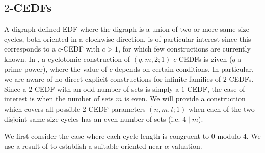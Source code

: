 \documentclass[12pt, a4paper]{article}
\theoremstyle{definition}
\begin{document}
\subsection{$2$-CEDFs}
A digraph-defined EDF where the digraph is a union of two or more same-size cycles, both oriented in a clockwise direction, is of particular interest since this corresponds to a $c$-CEDF with $c>1$, for which few constructions are currently known. In \cite{Wuetal}, a cyclotomic construction of $(q,m,2;1)$-$c$-CEDFs is given ($q$ a prime power), where the value of $c$ depends on certain conditions. In particular, we are aware of no direct explicit constructions for infinite families of $2$-CEDFs.  Since a $2$-CEDF with an odd number of sets is simply a $1$-CEDF, the case of interest is when the number of sets $m$ is even.  We will provide a construction which covers all possible 2-CEDF parameters $(n,m,l;1)$ when each of the two disjoint same-size cycles has an even number of sets (i.e. $4 \mid m$).

We first consider the case where each cycle-length is congruent to $0$ modulo $4$. We use a result of \cite{Abr} to establish a suitable oriented near $\alpha$-valuation.
\end{document}
